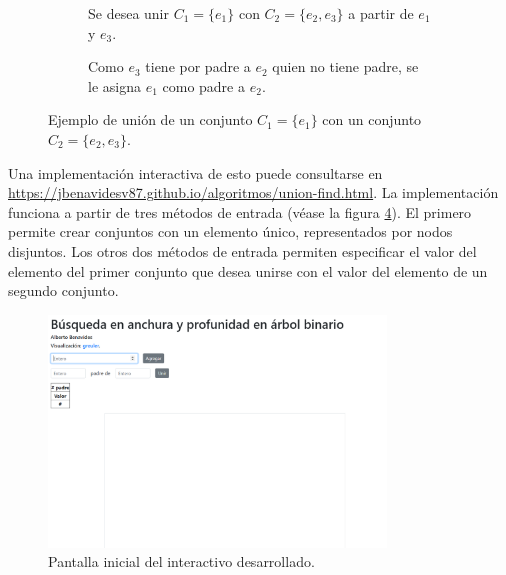 \documentclass[paper=leter, fontsize=11pt]{scrartcl}
\numberwithin{equation}{section}		%
\numberwithin{figure}{section}			%
\numberwithin{table}{section}				%
\begin{document}
\begin{figure}
    \begin{subfigure}{.45\textwidth}
        \centering
        \caption{Se desea unir $C_1 = \{e_1\}$ con $C_2 = \{e_2, e_3\}$ a partir de $e_1$ y $e_3$.}
        \label{nodo}
    \end{subfigure}
    \hfill
    \begin{subfigure}{.45\textwidth}
        \centering
        \caption{Como $e_3$ tiene por padre a $e_2$ quien no tiene padre, se le asigna $e_1$ como padre a $e_2$.}
        \label{grafo}
    \end{subfigure}

    \caption{Ejemplo de unión de un conjunto $C_1 = \{e_1\}$ con un conjunto $C_2 = \{e_2, e_3\}$.}
    \label{ejemplo_union}
\end{figure}

Una implementación interactiva de esto puede consultarse en \url{https://jbenavidesv87.github.io/algoritmos/union-find.html}. La implementación funciona a partir de tres métodos de entrada (véase la figura \ref{pantalla_inicio}). El primero permite crear conjuntos con un elemento único, representados por nodos disjuntos. Los otros dos métodos de entrada permiten especificar el valor del elemento del primer conjunto que desea unirse con el valor del elemento de un segundo conjunto.

\begin{figure}
    \centering
    \includegraphics[width=0.8\textwidth]{1.png}
    \caption{Pantalla inicial del interactivo desarrollado.}
    \label{pantalla_inicio}
\end{figure}
\end{document}
